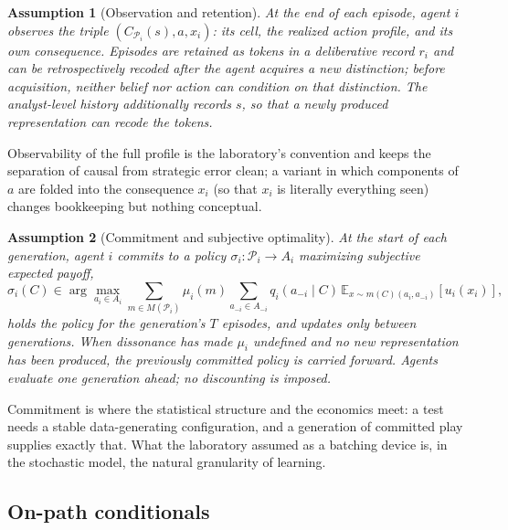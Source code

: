 \documentclass[11pt]{article}
\newtheorem{assumption}{Assumption}[section]
\begin{document}
\begin{assumption}[Observation and retention]
\label{ass:observation}
At the end of each episode, agent $i$ observes the triple
$(C_{\mathcal P_i}(s),a,x_i)$: its cell, the realized action profile, and its
own consequence.  Episodes are retained as tokens in a deliberative record
$r_i$ and can be retrospectively recoded after the agent acquires a new
distinction; before acquisition, neither belief nor action can condition on
that distinction.  The analyst-level history additionally records $s$, so that
a newly produced representation can recode the tokens.
\end{assumption}

Observability of the full profile is the laboratory's convention and keeps the
separation of causal from strategic error clean; a variant in which components
of $a$ are folded into the consequence $x_i$ (so that $x_i$ is literally
everything seen) changes bookkeeping but nothing conceptual.

\begin{assumption}[Commitment and subjective optimality]
\label{ass:commitment}
At the start of each generation, agent $i$ commits to a policy
$\sigma_i:\mathcal P_i\to A_i$ maximizing subjective expected payoff,
\begin{equation}
\sigma_i(C)\in\arg\max_{a_i\in A_i}
\sum_{m\in M(\mathcal P_i)}\mu_i(m)
\sum_{a_{-i}\in A_{-i}}q_i(a_{-i}\mid C)\,
\mathbb E_{x\sim m(C)(a_i,a_{-i})}\!\left[u_i(x_i)\right],
\label{eq:subjective-optimality}
\end{equation}
holds the policy for the generation's $T$ episodes, and updates only between
generations.  When dissonance has made $\mu_i$ undefined and no new
representation has been produced, the previously committed policy is carried
forward.  Agents evaluate one generation ahead; no discounting is imposed.
\end{assumption}

Commitment is where the statistical structure and the economics meet: a test
needs a stable data-generating configuration, and a generation of committed
play supplies exactly that.  What the laboratory assumed as a batching device
is, in the stochastic model, the natural granularity of learning.

\subsection{On-path conditionals}
\end{document}
